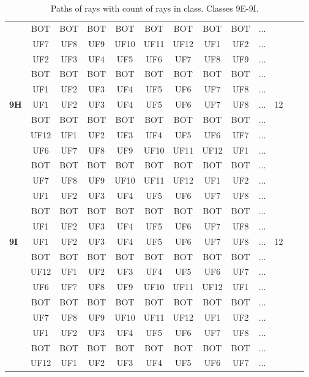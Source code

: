 \begin{table}[h!]
\begin{tabular}{|l|c|c|c|c|c|c|c|c|c|c|c|c|}
 & BOT & BOT & BOT & BOT & BOT & BOT & BOT & BOT & $\dots$ & \\
 & UF7 & UF8 & UF9 & UF10 & UF11 & UF12 & UF1 & UF2 & $\dots$ & \\
 & UF2 & UF3 & UF4 & UF5 & UF6 & UF7 & UF8 & UF9 & $\dots$ & \\
 & BOT & BOT & BOT & BOT & BOT & BOT & BOT & BOT & $\dots$ & \\
 & UF1 & UF2 & UF3 & UF4 & UF5 & UF6 & UF7 & UF8 & $\dots$ & \\
\hline \hline
\textbf{9H} & UF1 & UF2 & UF3 & UF4 & UF5 & UF6 & UF7 & UF8 & $\dots$ & 12\\
 & BOT & BOT & BOT & BOT & BOT & BOT & BOT & BOT & $\dots$ & \\
 & UF12 & UF1 & UF2 & UF3 & UF4 & UF5 & UF6 & UF7 & $\dots$ & \\
 & UF6 & UF7 & UF8 & UF9 & UF10 & UF11 & UF12 & UF1 & $\dots$ & \\
 & BOT & BOT & BOT & BOT & BOT & BOT & BOT & BOT & $\dots$ & \\
 & UF7 & UF8 & UF9 & UF10 & UF11 & UF12 & UF1 & UF2 & $\dots$ & \\
 & UF1 & UF2 & UF3 & UF4 & UF5 & UF6 & UF7 & UF8 & $\dots$ & \\
 & BOT & BOT & BOT & BOT & BOT & BOT & BOT & BOT & $\dots$ & \\
 & UF1 & UF2 & UF3 & UF4 & UF5 & UF6 & UF7 & UF8 & $\dots$ & \\
\hline \hline
\textbf{9I} & UF1 & UF2 & UF3 & UF4 & UF5 & UF6 & UF7 & UF8 & $\dots$ & 12\\
 & BOT & BOT & BOT & BOT & BOT & BOT & BOT & BOT & $\dots$ & \\
 & UF12 & UF1 & UF2 & UF3 & UF4 & UF5 & UF6 & UF7 & $\dots$ & \\
 & UF6 & UF7 & UF8 & UF9 & UF10 & UF11 & UF12 & UF1 & $\dots$ & \\
 & BOT & BOT & BOT & BOT & BOT & BOT & BOT & BOT & $\dots$ & \\
 & UF7 & UF8 & UF9 & UF10 & UF11 & UF12 & UF1 & UF2 & $\dots$ & \\
 & UF1 & UF2 & UF3 & UF4 & UF5 & UF6 & UF7 & UF8 & $\dots$ & \\
 & BOT & BOT & BOT & BOT & BOT & BOT & BOT & BOT & $\dots$ & \\
 & UF12 & UF1 & UF2 & UF3 & UF4 & UF5 & UF6 & UF7 & $\dots$ & \\
\hline 
\end{tabular}
\caption{Paths of rays with count of rays in class. Classes 9E-9I.}
\label{table:TableClasses5}
\end{table}

